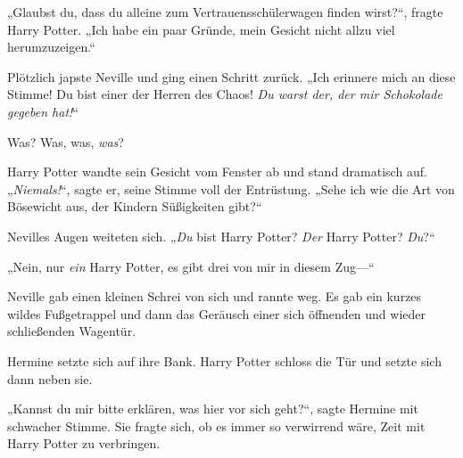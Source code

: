 „Glaubst du, dass du alleine zum Vertrauensschülerwagen finden wirst?“, fragte Harry Potter. „Ich habe ein paar Gründe, mein Gesicht nicht allzu viel herumzuzeigen.“

Plötzlich japste Neville und ging einen Schritt zurück. „Ich erinnere mich an diese Stimme! Du bist einer der Herren des Chaos! \emph{Du warst der, der mir Schokolade gegeben hat!}“

Was? Was, was, \emph{was}?

Harry Potter wandte sein Gesicht vom Fenster ab und stand dramatisch auf. „\emph{Niemals!}“, sagte er, seine Stimme voll der Entrüstung. „Sehe ich wie die Art von Bösewicht aus, der Kindern Süßigkeiten gibt?“

Nevilles Augen weiteten sich. „\emph{Du} bist Harry Potter? \emph{Der} Harry Potter? \emph{Du}?“

„Nein, nur \emph{ein} Harry Potter, es gibt drei von mir in diesem Zug—“

Neville gab einen kleinen Schrei von sich und rannte weg. Es gab ein kurzes wildes Fußgetrappel und dann das Geräusch einer sich öffnenden und wieder schließenden Wagentür.

Hermine setzte sich auf ihre Bank. Harry Potter schloss die Tür und setzte sich dann neben sie.

„Kannst du mir bitte erklären, was hier vor sich geht?“, sagte Hermine mit schwacher Stimme. Sie fragte sich, ob es immer so verwirrend wäre, Zeit mit Harry Potter zu verbringen.

